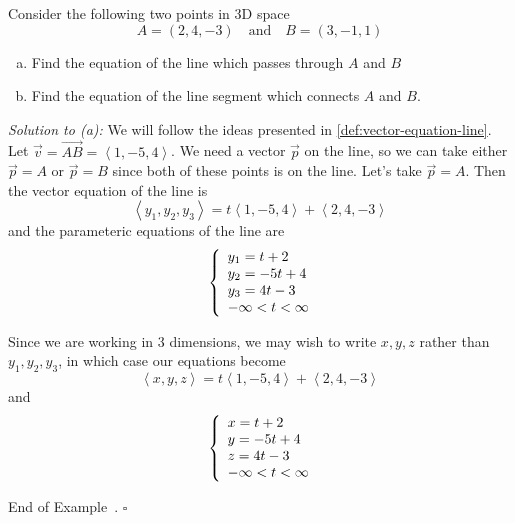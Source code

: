 \documentclass[10pt]{article}
\theoremstyle{definition}
\newtheorem{example}[theorem]{Example}
\renewenvironment{example}
{\begin{oldexample}}
  {\par\smallskip\hfill   End of Example~\theexample. $\square$    \par\end{oldexample}}
\newcommand{\1}[1]{\textbf{1}_{\left[#1\right]}} %
\begin{document}
\begin{example}
  Consider the following two points in 3D space
  \begin{equation*}
    A = (2,4,-3) \quad \text{and} \quad B = (3,-1,1)
  \end{equation*}
  \begin{enumerate}[(a)]
    \item Find the equation of the line which passes through $A$ and $B$
    \item Find the equation of the line segment which connects $A$ and $B$.
  \end{enumerate}

  \textit{Solution to (a):}
  We will follow the ideas presented in \cref{def:vector-equation-line}. Let $\vec{v} = \overrightarrow{AB} = \left\langle 1,-5,4 \right\rangle$. We
  need a vector $\vec{p}$ on the line, so we can take either $\vec{p}=A$ or
  $\vec{p}=B$ since both of these points is on the line. Let's take $\vec{p}=A$.
  Then the vector equation of the line is
  \begin{equation*}
    \left\langle y_{1},y_{2},y_{3} \right\rangle 
    = t\left\langle 1,-5,4 \right\rangle +\left\langle 2,4,-3 \right\rangle 
  \end{equation*}
  and the parameteric equations of the line are
  \begin{equation*}
    \left\{ \begin{array}{l@{}l}
        y_{1}=t+2\\
        y_{2}=-5t+4\\
        y_{3}=4t-3 \\
        -\infty<t<\infty
      \end{array}\right.
  \end{equation*}

  Since we are working in 3 dimensions, we may wish to write $x,y,z$ rather than
  $y_{1},y_{2},y_{3}$, in which case our equations become
  \begin{equation*}
    \left\langle x,y,z \right\rangle
    =t \left\langle 1,-5,4 \right\rangle + \left\langle 2,4,-3 \right\rangle
  \end{equation*}
  and
  \begin{equation*}
    \left\{ \begin{array}{l@{}l}
        x=t+2\\
        y=-5t+4\\
        z=4t-3 \\
        -\infty<t<\infty
      \end{array}\right.
  \end{equation*}


\end{example}
\end{document}
